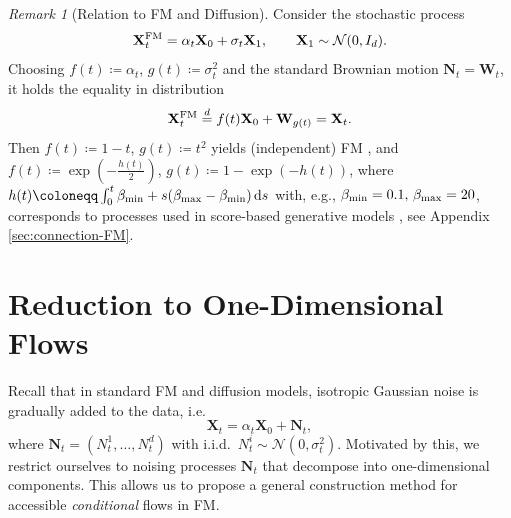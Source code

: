 \documentclass{article}
\renewcommand{\d}{\, \mathrm{d}}
\theoremstyle{plain}
\theoremstyle{definition}
\theoremstyle{remark}
\newtheorem{remark}[theorem]{Remark}
\begin{document}
 
\begin{remark}[Relation to FM and Diffusion] \label{rem:x}
Consider the stochastic process 
\begin{equation}\label{DDIM_process}
     \mathbf{X}_t^{\rm FM} = \alpha_t  \mathbf{X}_0 + \sigma_t \mathbf{X}_1, \qquad \mathbf{X}_1 \sim \mathcal{N}(0,I_d).
\end{equation}
Choosing $f(t) \coloneqq \alpha_t$, $g(t) \coloneqq \sigma_t^2$ and the standard Brownian motion  $\mathbf{N}_t=\mathbf{W}_t$, it holds the equality in distribution 
\begin{equation}\label{equal-distribution}
   \mathbf{X}_t^{\rm FM} \overset{d}{=} f(t)\mathbf{X}_0 + \mathbf{W}_{g(t)} 
   = \mathbf{X}_t .
\end{equation}
Then $f(t) \coloneqq 1-t$, $g(t) \coloneqq t^2$ yields (independent) FM \cite{lipman2023flow}, and  
$f(t) \coloneqq \exp\left( -\frac{h(t)}{2} \right)$, $g(t) \coloneqq 1 - \exp\left( -h(t) \right)$, where $h(t) \coloneqq \int_0^t \beta_{\rm min} + s(\beta_{\rm max} - \beta_{\rm min}) \d s$ with, e.g.,  $\beta_{\rm min} = 0.1, \, \beta_{\rm max} = 20$, corresponds to processes used in score-based generative models \cite{song2021scorebasedgenerativemodelingstochastic}, see Appendix \ref{sec:connection-FM}.
\end{remark}


%
\section{Reduction to One-Dimensional Flows}\label{sec:dD}
Recall that in standard FM and diffusion models, isotropic Gaussian noise is gradually added to the data, i.e.\
\begin{equation}\label{motivation-isotropic}
    \mathbf{X}_t = \alpha_t \mathbf{X}_0 +  \mathbf{N}_t,
\end{equation}
where $\mathbf{N}_t=(N_t^1,\dots, N_t^d)$ with i.i.d.\ $N_t^i \sim \mathcal{N}(0, \sigma_t^2)$.
Motivated by this, 
we restrict ourselves to noising processes $\mathbf{N}_t$ that decompose into one-dimensional components. This allows us to propose {a general construction method for} accessible \emph{conditional} flows in FM.
\end{document}

